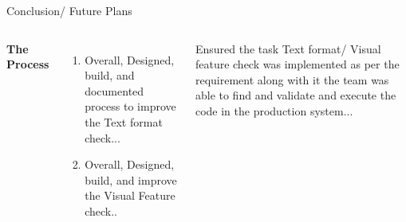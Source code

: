 \documentclass[aspectratio=169,xcolor=dvipsnames]{beamer}
\begin{document}
\begin{frame}{Conclusion/ Future Plans}
    \tableofcontents

    \begin{columns}[c] %

        \textbf{The Process}
        \begin{enumerate}
            \item Overall, Designed, build, and documented process to improve the Text format check...
            \item Overall, Designed, build, and improve the Visual Feature check.. 
        \end{enumerate}

         Ensured the task Text format/ Visual feature check was implemented as per the requirement along with it the team was able to find and validate and execute the code in the production system...

    \end{columns}   \\

\end{frame}
\end{document}

